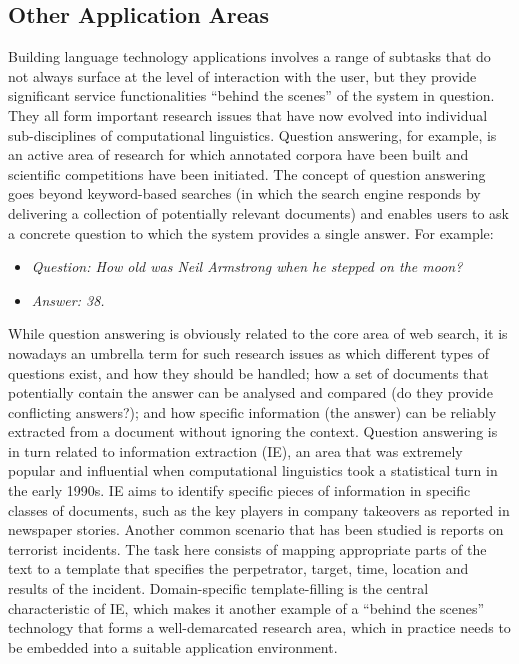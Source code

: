 \documentclass[]{../../metanetpaper}
\begin{document}
\begin{multicols}{2}
\subsection{Other Application Areas}

Building language technology applications involves a range of subtasks that do not always surface at the level of interaction with the user, but they provide significant service functionalities “behind the scenes” of the system in question. They all form important research issues that have now evolved into individual sub-disciplines of computational linguistics. Question answering, for example, is an active area of research for which annotated corpora have been built and scientific competitions have been initiated. The concept of question answering goes beyond keyword-based searches (in which the search engine responds by delivering a collection of potentially relevant documents) and enables users to ask a concrete question to which the system provides a single answer. For example:

\begin{itemize}
\item[] \textit{Question: How old was Neil Armstrong when he stepped on the moon?}
\item[] \textit{Answer: 38.}
\end{itemize}

While question answering is obviously related to the core area of web search, it is nowadays an umbrella term for such research issues as which different types of questions exist, and how they should be handled; how a set of documents that potentially contain the answer can be analysed and compared (do they provide conflicting answers?); and how specific information (the answer) can be reliably extracted from a document without ignoring the context. Question answering is in turn related to information extraction (IE), an area that was extremely popular and influential when computational linguistics took a statistical turn in the early 1990s. IE aims to identify specific pieces of information in specific classes of documents, such as the key players in company takeovers as reported in newspaper stories. Another common scenario that has been studied is reports on terrorist incidents. The task here consists of mapping appropriate parts of the text to a template that specifies the perpetrator, target, time, location and results of the incident. Domain-specific template-filling is the central characteristic of IE, which makes it another example of a “behind the scenes” technology that forms a well-demarcated research area, which in practice needs to be embedded into a suitable application environment.


\end{multicols}
\end{document}

